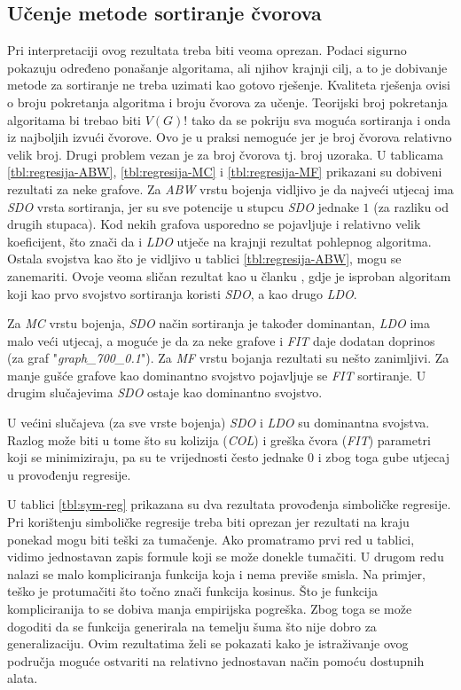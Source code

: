 \documentclass[times, utf8, diplomski, numeric]{fer}
\begin{document}
\subsection{Učenje metode sortiranje čvorova}

Pri interpretaciji ovog rezultata treba biti veoma oprezan. Podaci sigurno pokazuju određeno ponašanje algoritama, ali njihov krajnji cilj, a to je dobivanje metode za sortiranje ne treba uzimati kao gotovo rješenje. Kvaliteta rješenja ovisi o broju pokretanja algoritma i broju čvorova za učenje. Teorijski broj pokretanja algoritama bi trebao biti $V(G)!$ tako da se pokriju sva moguća sortiranja i onda iz najboljih izvući čvorove. Ovo je u praksi nemoguće jer je broj čvorova relativno velik broj. Drugi problem vezan je za broj čvorova tj. broj uzoraka. U tablicama \ref{tbl:regresija-ABW}, \ref{tbl:regresija-MC} i \ref{tbl:regresija-MF} prikazani su dobiveni rezultati za neke grafove. Za \emph{ABW} vrstu bojenja vidljivo je da najveći utjecaj ima \emph{SDO} vrsta sortiranja, jer su sve potencije u stupcu \emph{SDO} jednake $1$ (za razliku od drugih stupaca). Kod nekih grafova usporedno se pojavljuje i relativno velik koeficijent, što znači da i \emph{LDO} utječe na krajnji rezultat pohlepnog algoritma. Ostala svojstva kao što je vidljivo u tablici \ref{tbl:regresija-ABW}, mogu se zanemariti. Ovoje veoma sličan rezultat kao u članku \cite{lit7}, gdje je isproban algoritam koji kao prvo svojstvo sortiranja koristi \emph{SDO}, a kao drugo \emph{LDO}.

Za \emph{MC} vrstu bojenja, \emph{SDO} način sortiranja je također dominantan, \emph{LDO} ima malo veći utjecaj, a moguće je da za neke grafove i \emph{FIT} daje dodatan doprinos (za graf "\emph{graph\_700\_0.1}"). Za \emph{MF} vrstu bojanja rezultati su nešto zanimljivi. Za manje gušće grafove kao dominantno svojstvo pojavljuje se \emph{FIT} sortiranje. U drugim slučajevima \emph{SDO} ostaje kao dominantno svojstvo.

U većini slučajeva (za sve vrste bojenja) \emph{SDO} i \emph{LDO} su dominantna svojstva. Razlog može biti u tome što su kolizija (\emph{COL}) i greška čvora (\emph{FIT}) parametri koji se minimiziraju, pa su te vrijednosti često jednake $0$ i zbog toga gube utjecaj u provođenju regresije.

U tablici \ref{tbl:sym-reg} prikazana su dva rezultata provođenja simboličke regresije. Pri korištenju simboličke regresije treba biti oprezan jer rezultati na kraju ponekad mogu biti teški za tumačenje. Ako promatramo prvi red u tablici, vidimo jednostavan zapis formule koji se može donekle tumačiti. U drugom redu nalazi se malo kompliciranja funkcija koja i nema previše smisla. Na primjer, teško je protumačiti što točno znači funkcija kosinus. Što je funkcija kompliciranija to se dobiva manja empirijska pogreška. Zbog toga se može dogoditi da se funkcija generirala na temelju šuma što nije dobro za generalizaciju. Ovim rezultatima želi se pokazati kako je istraživanje ovog područja moguće ostvariti na relativno jednostavan način pomoću dostupnih alata.
\end{document}
